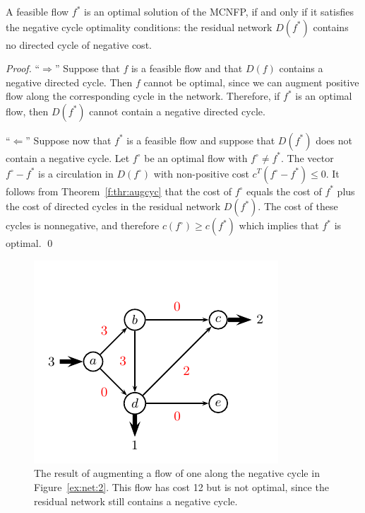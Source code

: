  
  
  \begin{theorem}
    \label{f:thr:13}
    A feasible flow $f^*$ is an optimal solution of the MCNFP, 
    if and only if it satisfies the negative
    cycle optimality conditions: the residual network $D(f^*)$
    contains no directed cycle of negative cost.    
  \end{theorem}

  \begin{proof}
    

  ``$\Rightarrow$'' Suppose that $f$ is a feasible flow and that $D(f)$ contains
  a negative directed cycle. Then $f$ cannot be optimal, since we can
  augment positive flow along the corresponding cycle in the
  network. Therefore, if $f^*$ is an optimal flow, then $D(f^*)$
  cannot contain a negative directed cycle. 

  ``$\Leftarrow$'' Suppose now that $f^*$ is a feasible flow and suppose that
  $D(f^*)$ does not contain a negative cycle. Let $f^\circ$ be an optimal
  flow with $f^\circ \neq f^*$. The vector $f^\circ-f^*$ is a circulation in
  $D(f^\circ)$ with
  non-positive cost $c^T(f^\circ-f^*) \leq0$. It follows from
  Theorem~\ref{f:thr:augcyc} that the cost of $f^\circ$ equals the cost of
  $f^*$ plus  the cost of directed cycles in the residual network
  $D(f^*)$.  The cost of these cycles is nonnegative, and therefore
  $c(f^\circ) \geq c(f^*)$ which implies that $f^*$ is optimal. 
  \qed
\end{proof}




\begin{figure}
  \centering
  
  \includegraphics{figures/flows5.pdf} 
\caption{The result of augmenting a flow of one along the negative
  cycle in Figure~\ref{ex:net:2}. This flow has cost 12 but is not
  optimal, since the residual network still contains a negative
  cycle.}\label{ex:net:3}
\end{figure}





